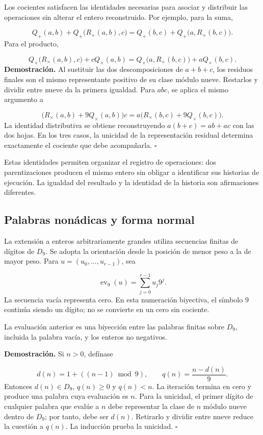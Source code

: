 Los cocientes satisfacen las identidades necesarias para asociar y distribuir las operaciones sin alterar el entero reconstruido. Por ejemplo, para la suma,

\[
Q_+(a,b)+Q_+\bigl(R_+(a,b),c\bigr)
=Q_+(b,c)+Q_+\bigl(a,R_+(b,c)\bigr).
\]
Para el producto,

\[
Q_\times\bigl(R_\times(a,b),c\bigr)+cQ_\times(a,b)
=Q_\times\bigl(a,R_\times(b,c)\bigr)+aQ_\times(b,c).
\]
\textbf{Demostración.} Al sustituir las dos descomposiciones de $a+b+c$, los residuos finales son el mismo representante positivo de su clase módulo nueve. Restarlos y dividir entre nueve da la primera igualdad. Para $abc$, se aplica el mismo argumento a

\[
\bigl(R_\times(a,b)+9Q_\times(a,b)\bigr)c
=a\bigl(R_\times(b,c)+9Q_\times(b,c)\bigr).
\]
La identidad distributiva se obtiene reconstruyendo $a(b+c)=ab+ac$ con las dos hojas. En los tres casos, la unicidad de la representación residual determina exactamente el cociente que debe acompañarla. \hfill\(\square\)

Estas identidades permiten organizar el registro de operaciones: dos parentizaciones producen el mismo entero sin obligar a identificar sus historias de ejecución. La igualdad del resultado y la identidad de la historia son afirmaciones diferentes.

\subsection{Palabras nonádicas y forma normal}
La extensión a enteros arbitrariamente grandes utiliza secuencias finitas de dígitos de $D_9$. Se adopta la orientación desde la posición de menor peso a la de mayor peso. Para $u=(u_0,\ldots,u_{r-1})$, sea

\[
\operatorname{ev}_9(u)=\sum_{j=0}^{r-1}u_j9^j.
\]
La secuencia vacía representa cero. En esta numeración biyectiva, el símbolo $9$ continúa siendo un dígito; no se convierte en un cero sin cociente.

La evaluación anterior es una biyección entre las palabras finitas sobre $D_9$, incluida la palabra vacía, y los enteros no negativos.

\textbf{Demostración.} Si $n>0$, defínase

\[
d(n)=1+((n-1)\bmod9),\qquad q(n)=\frac{n-d(n)}9.
\]
Entonces $d(n)\in D_9$, $q(n)\ge0$ y $q(n)<n$. La iteración termina en cero y produce una palabra cuya evaluación es $n$. Para la unicidad, el primer dígito de cualquier palabra que evalúe a $n$ debe representar la clase de $n$ módulo nueve dentro de $D_9$; por tanto, debe ser $d(n)$. Retirarlo y dividir entre nueve reduce la cuestión a $q(n)$. La inducción prueba la unicidad. \hfill\(\square\)

